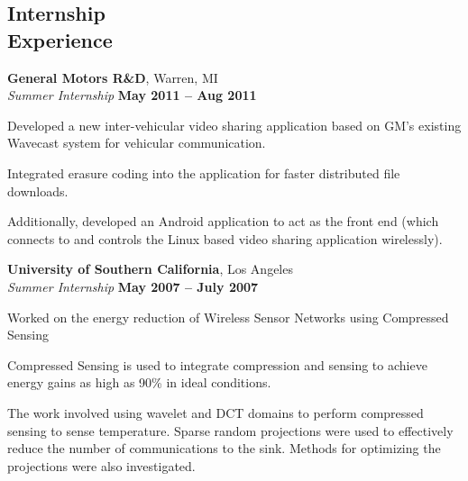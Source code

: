 \documentclass[margin,line]{resume}
\begin{document}
\begin{resume}
\section{\mysidestyle Internship\\Experience}



    \textbf{General Motors R\&D}, Warren, MI\\
    \textsl{Summer Internship} \hfill \textbf{May 2011 -- Aug 2011}
    \begin{list2}
    \item Developed a new inter-vehicular video sharing application based on GM's existing Wavecast system for vehicular communication.
    \item Integrated erasure coding into the application for faster distributed file downloads. 
    \item Additionally, developed an Android application to act as the front end (which connects to and controls the Linux based video sharing application wirelessly).
    \end{list2}
    

    \textbf{University of Southern California}, Los Angeles\\%
    \textsl{Summer Internship} \hfill \textbf{May 2007 -- July 2007}
    \begin{list2}
    \item Worked on the energy reduction of Wireless Sensor Networks using Compressed Sensing
    \item Compressed Sensing is used to integrate compression and sensing to achieve energy gains as high as 90\% in ideal conditions.
    \item The work involved using wavelet and DCT domains to perform compressed sensing to sense temperature. Sparse random projections were used to effectively reduce the number of communications to the sink. Methods for optimizing the projections were also investigated.     
    \end{list2}
    

\end{resume}
\end{document}
